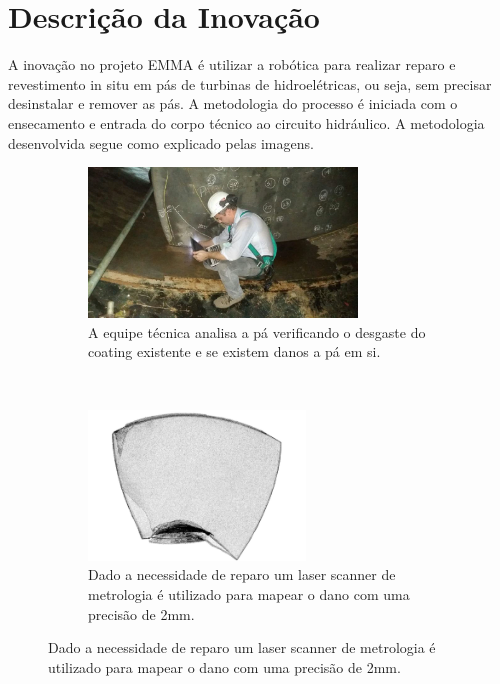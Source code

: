 
\section{Descrição da Inovação}

A inovação no projeto EMMA é utilizar a robótica para realizar reparo e
revestimento in situ em pás de turbinas de hidroelétricas, ou seja, sem precisar
desinstalar e remover as pás. A metodologia do processo é iniciada com o
ensecamento e entrada do corpo técnico ao circuito hidráulico. A metodologia
desenvolvida segue como explicado pelas imagens.

\begin{figure}[H] 
\begin{subfigure}{0.5\textwidth}
\includegraphics[width=0.9\linewidth, height=4cm]{figs/manolo} 
\caption{A equipe técnica analisa a pá verificando o desgaste do coating
existente e se existem danos a pá em si.}
\label{fig:subim1}
\end{subfigure}
~
\begin{subfigure}{0.5\textwidth}
\label{fig:subim2}
\includegraphics[width=0.9\linewidth, height=4cm]{figs/modelo_pa_faro}
\caption{Dado a necessidade de reparo um laser scanner de metrologia é
utilizado para mapear o dano com uma precisão de 2mm.}
\end{subfigure}
 \label{fig:image2}
\end{figure}

